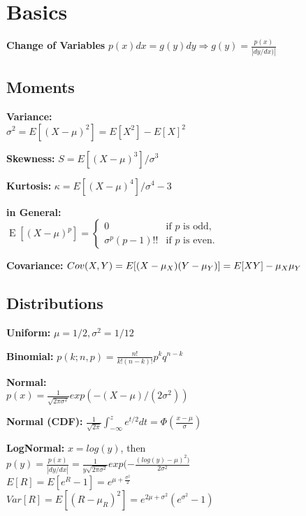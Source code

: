 \section{Basics}
\textbf{Change of Variables}
$p(x)dx = g(y)dy \Rightarrow g(y) = \frac{p(x)}{|dy/dx)|}$
\subsection{Moments}

\textbf{Variance:} \\$\sigma^2 = E[(X-\mu)^2] = E[X^2] - E[X]^2$

\textbf{Skewness:} $S = E[(X-\mu)^3]/\sigma^3 $

\textbf{Kurtosis:} $\kappa = E[(X-\mu)^4]/\sigma^4 -3$

\textbf{in General:} \\ $\operatorname {E} \left[(X-\mu )^{p}\right]={\begin{cases}0&{\text{if }}p{\text{ is odd,}}\\\sigma ^{p}(p-1)!!&{\text{if }}p{\text{ is even.}}\end{cases}}$

\textbf{Covariance:} $Cov(X,Y) = \\E[(X-\mu_X)(Y-\mu_Y)] = E[XY] - \mu_X\mu_Y$

\subsection{Distributions}

\textbf{Uniform:} $\mu = 1/2, \sigma^2 = 1/12$

\textbf{Binomial:} $p(k; n,p) = \frac{n!}{k!(n-k)!}p^kq^{n-k}$

\textbf{Normal:} \\$p(x) = \frac{1}{\sqrt{2\pi \sigma^2}}exp(-(X-\mu)/(2\sigma^2))$

\textbf{Normal (CDF):} $\frac{1}{\sqrt{2\pi}} \int_{-\infty}^z e^{t/2}dt = \Phi(\frac{x-\mu}{\sigma})$

\textbf{LogNormal:} $x=log(y)$, then \\
$p(y) = \frac{p(x)}{|dy/dx|} = \frac{1}{y\sqrt{2\pi \sigma^2}} exp(-\frac{(log(y)-\mu )^2)}{2\sigma^2}$ \\

$E[R] = E[e^R -1] = e^{\mu + \frac{\sigma^2}{2}}$ \\
$Var[R] = E[(R - \mu_R)^2] = e^{2\mu +\sigma^2}(e^{\sigma^2} -1)$ \\


